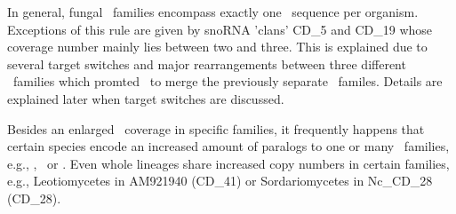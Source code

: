 In general, fungal \sno\
families encompass exactly one \sno\ sequence per organism. Exceptions
of this rule are given by snoRNA 'clans' CD\_5 and CD\_19 whose coverage
number mainly lies between two and three. This is explained due to several 
target switches and major rearrangements between three different \sno\ 
families which promted \snostrip\ to merge the previously separate
\sno\ familes. Details are explained later when target switches are discussed.


Besides an enlarged \sno\ coverage in specific families, it frequently
happens that certain species encode an increased amount of paralogs to
one or many \sno\ families, e.g., \Ppl, \Asp\ or \Nfu. Even whole
lineages share increased copy numbers in certain families, e.g.,
Leotiomycetes in AM921940 (CD\_41) or Sordariomycetes in Nc\_CD\_28
(CD\_28).

